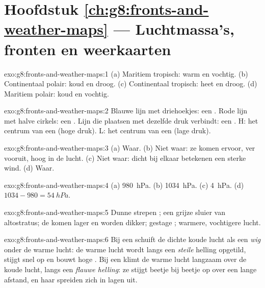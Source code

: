\section*{Hoofdstuk \ref{ch:g8:fronts-and-weather-maps} --- Luchtmassa's, fronten en weerkaarten}

\begin{solution}{exo:g8:fronts-and-weather-maps:1}
(a) Maritiem tropisch: warm en vochtig. (b) Continentaal polair: koud en
droog. (c) Continentaal tropisch: heet en droog. (d) Maritiem polair: koud
en vochtig.
\end{solution}

\begin{solution}{exo:g8:fronts-and-weather-maps:2}
Blauwe lijn met driehoekjes: een . Rode lijn met halve cirkels: een
. Lijn die plaatsen met dezelfde druk verbindt: een . H:
het centrum van een  (hoge druk). L: het centrum van een
 (lage druk).
\end{solution}

\begin{solution}{exo:g8:fronts-and-weather-maps:3}
(a) Waar. (b) Niet waar: ze komen ervoor, ver vooruit, hoog in de lucht.
(c) Niet waar:  dicht bij elkaar betekenen een sterke wind.
(d) Waar.
\end{solution}

\begin{solution}{exo:g8:fronts-and-weather-maps:4}
(a) \qty{980}{hPa}. (b) \qty{1034}{hPa}. (c) \qty{4}{hPa}. (d) $1034 -
980 = \qty{54}{hPa}$.
\end{solution}

\begin{solution}{exo:g8:fronts-and-weather-maps:5}
Dunne strepen ; een grijze sluier van altostratus; de  komen
lager en worden dikker; gestage ; warmere, vochtigere lucht.
\end{solution}

\begin{solution}{exo:g8:fronts-and-weather-maps:6}
Bij een  schuift de dichte koude lucht als een \emph{wig} onder de
warme lucht: de warme lucht wordt langs een \emph{steile} helling
opgetild, stijgt snel op en bouwt hoge . Bij een  klimt de
warme lucht langzaam over de koude lucht, langs een \emph{flauwe helling}:
ze stijgt beetje bij beetje op over een lange afstand, en haar 
spreiden zich in lagen uit.
\end{solution}

